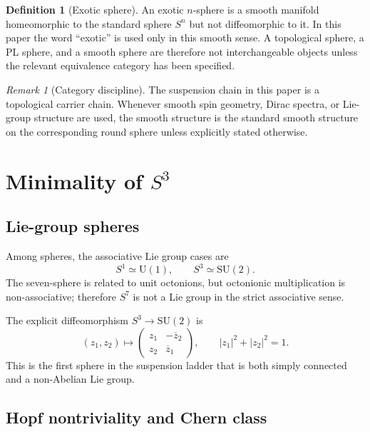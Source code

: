 \documentclass[11pt,a4paper]{article}
\theoremstyle{definition}
\newtheorem{definition}[theorem]{Definition}
\theoremstyle{remark}
\newtheorem{remark}[theorem]{Remark}
\newcommand{\Sn}[1]{S^{#1}}
\newcommand{\Sone}{S^{1}}
\newcommand{\Sthree}{S^{3}}
\newcommand{\Sseven}{S^{7}}
\newcommand{\SU}{\mathrm{SU}}
\newcommand{\U}{\mathrm{U}}
\begin{document}
\begin{definition}[Exotic sphere]
An exotic $n$-sphere is a smooth manifold homeomorphic to the standard sphere $\Sn{n}$ but
not diffeomorphic to it.  In this paper the word ``exotic'' is used only in this smooth sense.
A topological sphere, a PL sphere, and a smooth sphere are therefore not interchangeable
objects unless the relevant equivalence category has been specified.
\end{definition}

\begin{remark}[Category discipline]
The suspension chain in this paper is a topological carrier chain.  Whenever smooth spin
geometry, Dirac spectra, or Lie-group structure are used, the smooth structure is the standard
smooth structure on the corresponding round sphere unless explicitly stated otherwise.
\end{remark}

\section{Minimality of \texorpdfstring{$\Sthree$}{S3}}

\subsection{Lie-group spheres}

Among spheres, the associative Lie group cases are
\begin{equation}
\Sone\simeq \U(1),\qquad \Sthree\simeq\SU(2).
\end{equation}
The seven-sphere is related to unit octonions, but octonionic multiplication is non-associative;
therefore $\Sseven$ is not a Lie group in the strict associative sense.

The explicit diffeomorphism $\Sthree\to\SU(2)$ is
\begin{equation}
(z_{1},z_{2})\longmapsto
\begin{pmatrix}
z_{1} & -\overline{z}_{2}\\
z_{2} & \overline{z}_{1}
\end{pmatrix},
\qquad |z_{1}|^{2}+|z_{2}|^{2}=1.
\label{eq:s3-su2}
\end{equation}
This is the first sphere in the suspension ladder that is both simply connected and a non-Abelian
Lie group.

\subsection{Hopf nontriviality and Chern class}
\end{document}
